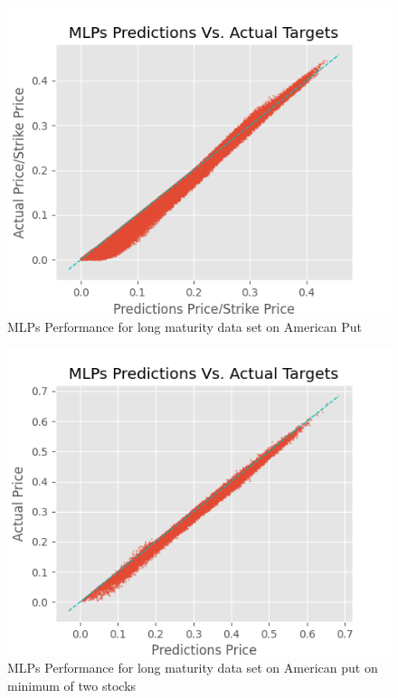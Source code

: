\begin{figure}[th]
\centering
\includegraphics{Figures/longTAmerP.png}
\decoRule
\caption[MLPs Performance for long maturity data set on American Put]{MLPs Performance for long maturity data set on American Put}
\label{fig:MLPsAmerPLongT}
\end{figure}

\begin{figure}[th]
\centering
\includegraphics{Figures/longTAmerMinP.png}
\decoRule
\caption[MLPs Performance on long maturity data set on American bivariate contingent claim]{MLPs Performance for long maturity data set on American put on minimum of two stocks}
\label{fig:MLPsAmerMin1}
\end{figure}


